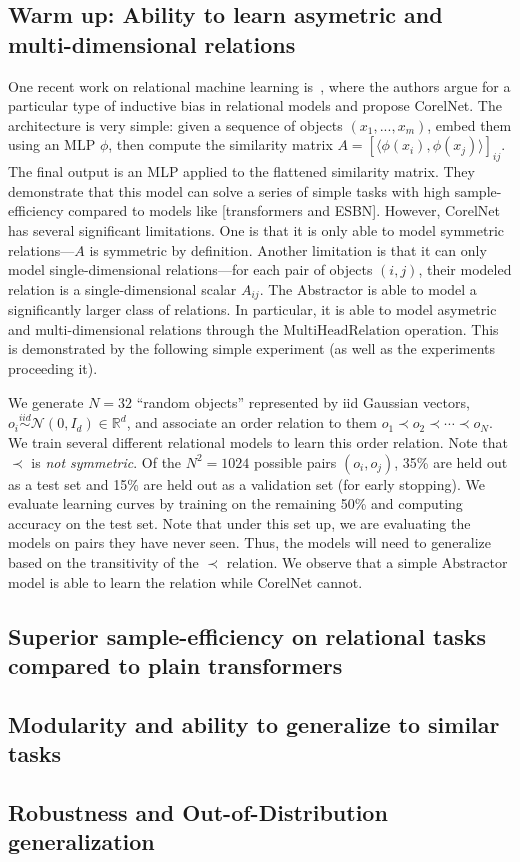 \subsection{Warm up: Ability to learn asymetric and multi-dimensional relations}
One recent work on relational machine learning is~\cite{corelnet}, where the authors argue for a particular type of inductive bias in relational models and propose CorelNet. The architecture is very simple: given a sequence of objects $(x_1, ..., x_m)$, embed them using an MLP $\phi$, then compute the similarity matrix $A = \left[\langle\phi(x_i), \phi(x_j)\rangle\right]_{ij}$. The final output is an MLP applied to the flattened similarity matrix. They demonstrate that this model can solve a series of simple tasks with high sample-efficiency compared to models like [transformers and ESBN]. However, CorelNet has several significant limitations. One is that it is only able to model symmetric relations---$A$ is symmetric by definition. Another limitation is that it can only model single-dimensional relations---for each pair of objects $(i,j)$, their modeled relation is a single-dimensional scalar $A_{ij}$. The Abstractor is able to model a significantly larger class of relations. In particular, it is able to model asymetric and multi-dimensional relations through the $\text{MultiHeadRelation}$ operation. This is demonstrated by the following simple experiment (as well as the experiments proceeding it).

We generate $N = 32$ ``random objects'' represented by iid Gaussian vectors, $o_i \overset{iid}{\sim} \mathcal{N}(0, I_d) \in \mathbb{R}^d$, and associate an order relation to them $o_1 \prec o_2 \prec \cdots \prec o_N$. We train several different relational models to learn this order relation. Note that $\prec$ is \textit{not symmetric}. Of the $N^2 = 1024$ possible pairs $(o_i, o_j)$, 35\% are held out as a test set and 15\% are held out as a validation set (for early stopping). We evaluate learning curves by training on the remaining 50\% and computing accuracy on the test set. Note that under this set up, we are evaluating the models on pairs they have never seen. Thus, the models will need to generalize based on the transitivity of the $\prec$ relation. We observe that a simple Abstractor model is able to learn the relation while CorelNet cannot.

\subsection{Superior sample-efficiency on relational tasks compared to plain transformers}

\subsection{Modularity and ability to generalize to similar tasks}

\subsection{Robustness and Out-of-Distribution generalization}